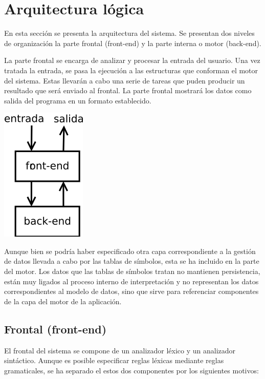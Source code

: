 \section {Arquitectura lógica}
En esta sección se presenta la arquitectura del sistema. Se presentan 
dos niveles de organización la parte frontal (front-end) y la parte 
interna o motor (back-end). 

La parte frontal se encarga de analizar y procesar la entrada del usuario.
Una vez tratada la entrada, se pasa la ejecución a las estructuras que conforman 
el motor del sistema. Estas llevarán a cabo una serie de tareas que puden producir
un resultado que será enviado al frontal. La parte frontal mostrará 
los datos como salida del programa en un formato establecido.

\begin{center}
\includegraphics[scale=0.7]{dia/generic.png} \\
\end{center}

Aunque bien se podría haber especificado otra capa correspondiente a la gestión de datos
llevada a cabo por las tablas de símbolos, esta se ha incluido en la parte del motor. Los datos que 
las tablas de símbolos tratan no mantienen persistencia, están muy ligados al proceso interno de 
interpretación y no representan los datos correspondientes al modelo de datos, sino que sirve para
referenciar componentes de la capa del motor de la aplicación.

\subsection{Frontal (front-end)}
El frontal del sistema se compone de un analizador léxico y un analizador sintáctico. 
Aunque es posible especificar reglas léxicas mediante reglas gramaticales, se ha separado el 
estos dos componentes por los siguientes motivos:

